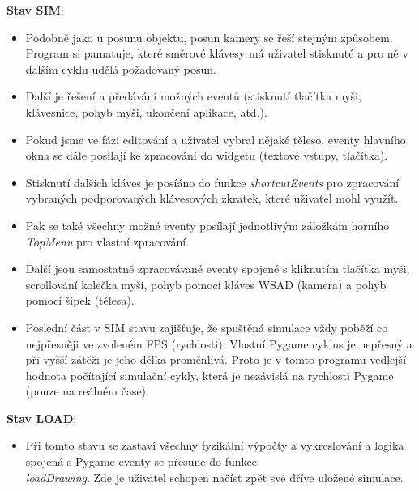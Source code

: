\documentclass[a4paper, 12pt]{article}
\begin{document}
\begin{itemize}
        \textbf{Stav SIM}:
        \begin{itemize}
            \setlength\itemsep{0pt}
            \item Podobně jako u posunu objektu, posun kamery se řeší stejným
                způsobem. Program si pamatuje, které směrové klávesy má
                uživatel stisknuté a pro ně v dalším cyklu udělá požadovaný
                posun.
            \item Další je řešení a předávání možných eventů (stisknutí
                tlačítka myši, klávesnice, pohyb myši, ukončení aplikace,
                atd.). 
            \item Pokud jsme ve fázi editování a uživatel vybral nějaké těleso,
                eventy hlavního okna se dále posílají ke zpracování do widgetu
                (textové vstupy, tlačítka). 
            \item Stisknutí dalších kláves je posíáno do funkce
                \emph{shortcutEvents} pro zpracování vybraných podporovaných
                klávesových zkratek, které uživatel mohl využít. 
            \item Pak se také všechny možné eventy posílají jednotlivým
                záložkám horního \emph{TopMenu} pro vlastní zpracování.
            \item Další jsou samostatně zpracovávané eventy spojené s kliknutím
                tlačítka myši, scrollování kolečka myši, pohyb pomocí kláves
                WSAD (kamera) a pohyb pomocí šipek (tělesa). 
            \item Poslední část v SIM stavu zajišťuje, že spuštěná simulace
                vždy poběží co nejpřesněji ve zvoleném FPS (rychlosti). Vlastní
                Pygame cyklus je nepřesný a při vyšší zátěži je jeho délka
                proměnlivá. Proto je v tomto programu vedlejší hodnota
                počítající simulační cykly, která je nezávislá na rychlosti
                Pygame (pouze na reálném čase).
        \end{itemize}

        \textbf{Stav LOAD}:
        \begin{itemize}
            \item Při tomto stavu se zastaví všechny fyzikální výpočty a
                vykreslování a logika spojená s Pygame eventy se přesune do
                funkce \\\emph{loadDrawing}. Zde je uživatel schopen načíst zpět
                své dříve uložené simulace.
        \end{itemize}


\end{itemize}
\end{document}
